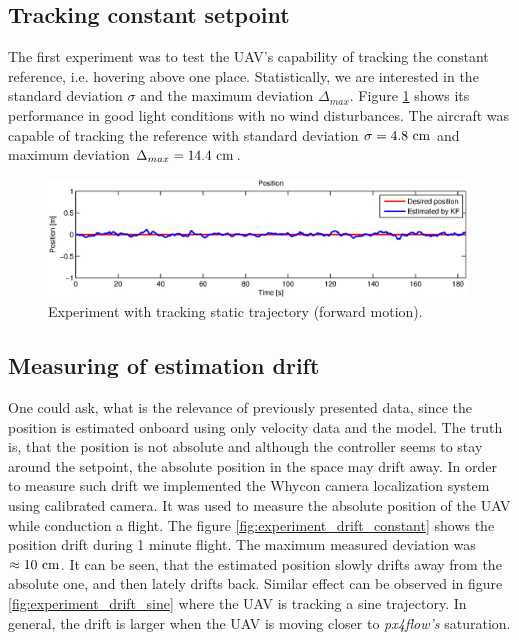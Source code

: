 \subsection{Tracking constant setpoint}
\label{cap:tracking_constant_trajectory}

The first experiment was to test the UAV's capability of tracking the constant reference, i.e. hovering above one place. Statistically, we are interested in the standard deviation $\sigma$ and the maximum deviation $\Delta_{max}$. Figure \ref{fig:experiment_constant_trajectory} shows its performance in good light conditions with no wind disturbances. The aircraft was capable of tracking the reference with standard deviation $\sigma = 4.8~\mathrm{cm}$ and maximum deviation $\Delta_{max} = 14.4~\mathrm{cm}$.

\begin{figure}[H]
\centering
\includegraphics[width=0.99\textwidth]{fig/experiment6_constant_reference.eps}
\caption{Experiment with tracking static trajectory (forward motion).}
\label{fig:experiment_constant_trajectory}
\end{figure}

\subsection{Measuring of estimation drift}

One could ask, what is the relevance of previously presented data, since the position is estimated onboard using only velocity data and the model. The truth is, that the position is not absolute and although the controller seems to stay around the setpoint, the absolute position in the space may drift away. In order to measure such drift we implemented the Whycon camera localization system \citep{faigl2013whycon} using calibrated camera. It was used to measure the absolute position of the UAV while conduction a flight. The figure \ref{fig:experiment_drift_constant} shows the position drift during 1 minute flight. The maximum measured deviation was $\approx 10~\mathrm{cm}$. It can be seen, that the estimated position slowly drifts away from the absolute one, and then lately drifts back. Similar effect can be observed in figure \ref{fig:experiment_drift_sine} where the UAV is tracking a sine trajectory. In general, the drift is larger when the UAV is moving closer to \emph{px4flow's} saturation.

